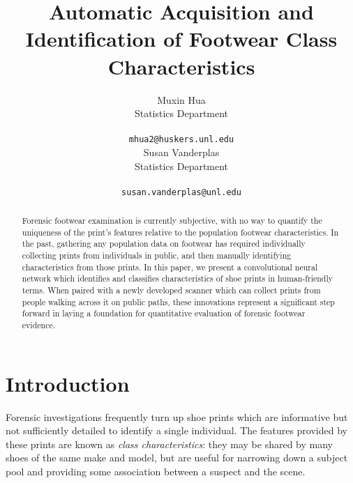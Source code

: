 \documentclass[10pt]{article}
\author{Muxin Hua\\
  Statistics Department\\ \\
{\tt mhua2@huskers.unl.edu}\\\And Susan Vanderplas\\
  Statistics Department\\ \\
{\tt susan.vanderplas@unl.edu}\\}
\title{Automatic Acquisition and Identification of Footwear Class
Characteristics}
\date{}
\newcommand{\svp}[1]{{\textcolor{RedOrange}{#1}}}
\begin{document}
\maketitle
\begin{abstract}
\svp{Forensic footwear examination is currently subjective, with no way to quantify the uniqueness of the print's features relative to the population footwear characteristics.
In the past, gathering any population data on footwear has required individually collecting prints from individuals in public, and then manually identifying characteristics from those prints.
In this paper, we present a convolutional neural network which identifies and classifies characteristics of shoe prints in human-friendly terms.
When paired with a newly developed scanner which can collect prints from people walking across it on public paths, these innovations represent a significant step forward in laying a foundation for quantitative evaluation of forensic footwear evidence.}

\end{abstract}


\section{Introduction}
\svp{Forensic investigations frequently turn up shoe prints which are informative but not sufficiently detailed to identify a single individual. The features provided by these prints are known as \emph{class characteristics}: they may be shared by many shoes of the same make and model, but are useful for narrowing down a subject pool and providing some association between a suspect and the scene.}
\end{document}
